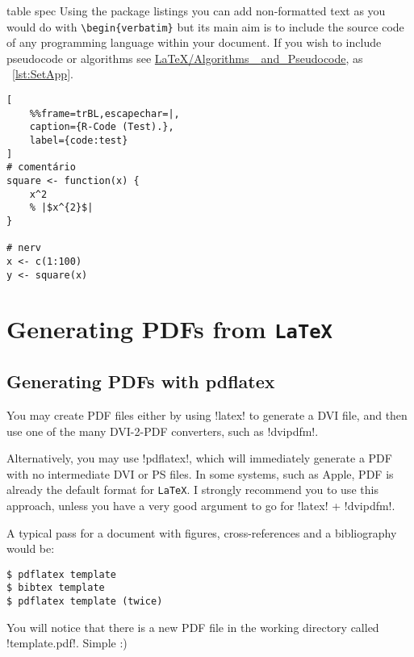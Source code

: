 \begin{tabular}[pos]{table spec}
Using the package listings you can add non-formatted text as you would do with \verb!\begin{verbatim}! but its main aim is to include the source code of any programming language within your document. If you wish to include pseudocode or algorithms see \href{http://en.wikibooks.org/wiki/LaTeX/Algorithms_and_Pseudocode}{LaTeX/Algorithms\_ and\_Pseudocode}, as \lstlistingname ~\ref{lst:SetApp}.


\begin{minipage}{\textwidth}
\lstset{language=R,numbers=left}
\begin{lstlisting}[
    %%frame=trBL,escapechar=|,
    caption={R-Code (Test).},
    label={code:test}
]
# comentário
square <- function(x) {
    x^2
    % |$x^{2}$|
}

# nerv
x <- c(1:100)
y <- square(x)
\end{lstlisting}
\end{minipage}
\section{Generating PDFs from \texttt{LaTeX}} %
\label{sec:generating_pdfs_from_latex}

\subsection{Generating PDFs with pdflatex} %
\label{ssec:generating_pdfs_with_pdflatex}

You may create PDF files either by using \spverb!latex! to generate a DVI file, and then use one of the many DVI-2-PDF converters, such as \spverb!dvipdfm!.

Alternatively, you may use \spverb!pdflatex!, which will immediately generate a PDF with no intermediate DVI or PS files. In some systems, such as Apple, PDF is already the default format for \texttt{LaTeX}. I strongly recommend you to use this approach, unless you have a very good argument to go for \spverb!latex! + \spverb!dvipdfm!.

A typical pass for a document with figures, cross-references and a bibliography would be:
\begin{verbatim}
$ pdflatex template
$ bibtex template
$ pdflatex template (twice)
\end{verbatim}
\begin{sloppypar}
You will notice that there is a new PDF file in the working directory called \spverb!template.pdf!. Simple :)
\end{sloppypar}



\end{tabular}
